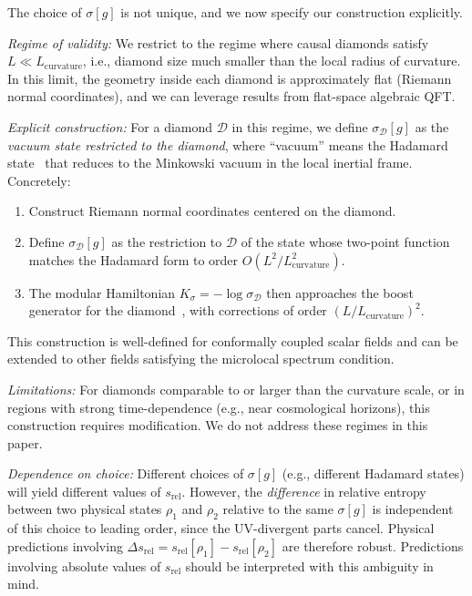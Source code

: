 \documentclass[aps,prd,twocolumn,superscriptaddress,nofootinbib,floatfix]{revtex4-2}
\newcommand{\Ddom}{\mathcal{D}}
\newcommand{\sr}{s_{\mathrm{rel}}}
\begin{document}
The choice of $\sigma[g]$ is not unique, and we now specify our construction explicitly.

\emph{Regime of validity:} We restrict to the regime where causal diamonds satisfy $L \ll L_{\mathrm{curvature}}$, i.e., diamond size much smaller than the local radius of curvature. In this limit, the geometry inside each diamond is approximately flat (Riemann normal coordinates), and we can leverage results from flat-space algebraic QFT.

\emph{Explicit construction:} For a diamond $\Ddom$ in this regime, we define $\sigma_{\Ddom}[g]$ as the \emph{vacuum state restricted to the diamond}, where ``vacuum'' means the Hadamard state~\cite{Wald1994} that reduces to the Minkowski vacuum in the local inertial frame. Concretely:
\begin{enumerate}
    \item Construct Riemann normal coordinates centered on the diamond.
    \item Define $\sigma_{\Ddom}[g]$ as the restriction to $\Ddom$ of the state whose two-point function matches the Hadamard form to order $O(L^2/L_{\mathrm{curvature}}^2)$.
    \item The modular Hamiltonian $K_\sigma = -\log \sigma_{\Ddom}$ then approaches the boost generator for the diamond~\cite{Casini2011}, with corrections of order $(L/L_{\mathrm{curvature}})^2$.
\end{enumerate}
This construction is well-defined for conformally coupled scalar fields and can be extended to other fields satisfying the microlocal spectrum condition.

\emph{Limitations:} For diamonds comparable to or larger than the curvature scale, or in regions with strong time-dependence (e.g., near cosmological horizons), this construction requires modification. We do not address these regimes in this paper.

\emph{Dependence on choice:} Different choices of $\sigma[g]$ (e.g., different Hadamard states) will yield different values of $\sr$. However, the \emph{difference} in relative entropy between two physical states $\rho_1$ and $\rho_2$ relative to the same $\sigma[g]$ is independent of this choice to leading order, since the UV-divergent parts cancel. Physical predictions involving $\Delta \sr = \sr[\rho_1] - \sr[\rho_2]$ are therefore robust. Predictions involving absolute values of $\sr$ should be interpreted with this ambiguity in mind.

\end{document}

